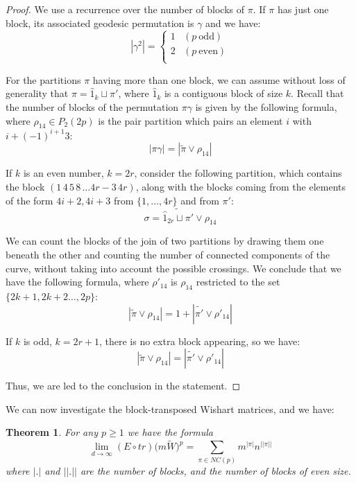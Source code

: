 \documentclass[12pt]{amsbook}
\newtheorem{theorem}{Theorem}[chapter]
\begin{document}
\begin{proof}
We use a recurrence over the number of blocks of $\pi$. If $\pi$ has just one block, its associated geodesic permutation is $\gamma$ and we have:
$$|\gamma^2|=\begin{cases}
1&(p\ \text{odd})\\ 
2&(p\ \text{even})\\
\end{cases}$$

For the partitions $\pi$ having more than one block, we can assume without loss of generality that $\pi = \hat 1_k \sqcup \pi'$, where $\hat 1_k$ is a contiguous block of size $k$. Recall that the number of blocks of the permutation $\pi\gamma$ is given by the following formula, where $\rho_{14} \in P_2(2p)$ is the pair partition which pairs an element $i$ with $i+(-1)^{i+1}3$:
$$|\pi\gamma|=|\widetilde{\pi}\vee\rho_{14}|$$

If $k$ is an even number, $k=2r$, consider the following partition, which contains the block $(1 \, 4 \, 5 \, 8 \, \ldots 4r-3 \, 4r)$, along with the blocks coming from the elements of the form $4i+2, 4i+3$ from $\{1, \ldots, 4r\}$ and from $\pi'$:
$$\sigma=\widetilde{\hat 1_{2r} \sqcup \pi'}\vee \rho_{14}$$

We can count the blocks of the join of two partitions by drawing them one beneath the other and counting the number of connected components of the curve, without taking into account the possible crossings. We conclude that we have the following formula, where $\rho'_{14}$ is $\rho_{14}$ restricted to the set $\{2k+1, 2k+2 \ldots, 2p\}$:
$$|\widetilde{\pi}\vee\rho_{14}|=1+|\widetilde{\pi'}\vee\rho'_{14}|$$

If $k$ is odd, $k=2r+1$, there is no extra block appearing, so we have:
$$|\widetilde{\pi}\vee\rho_{14}|=|\widetilde{\pi'}\vee\rho'_{14}|$$

Thus, we are led to the conclusion in the statement.
\end{proof}

We can now investigate the block-transposed Wishart matrices, and we have:

\begin{theorem}
For any $p\geq 1$ we have the formula
$$\lim_{d\to\infty}(E\circ tr)\big(m\widetilde{W}\big)^p
=\sum_{\pi\in NC(p)}m^{|\pi|}n^{||\pi||}$$
where $|.|$ and $||.||$ are the number of blocks, and the number of blocks of even size. 
\end{theorem}
\end{document}
